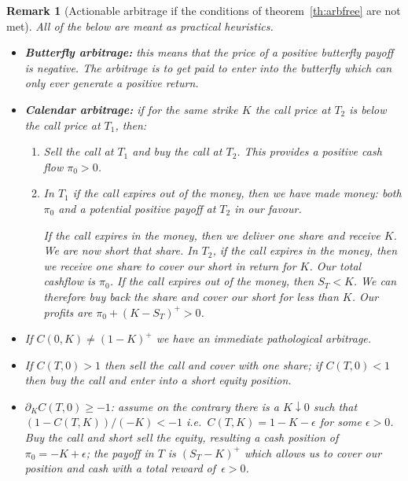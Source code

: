 \documentclass[11pt,a4paper]{article}
\newtheorem{remark}[definition]{Remark}
\begin{document}
\begin{remark}[Actionable arbitrage if the conditions of theorem~\ref{th:arbfree} are not met]\label{rem:actionable_arbitrage}
All of the below are meant as practical heuristics.
\begin{itemize}
    \item \textbf{Butterfly arbitrage:} this means that the price of a positive
    butterfly payoff is negative. The arbitrage is to get paid to enter into
    the butterfly which can only ever generate a positive return.

    \item \textbf{Calendar arbitrage:} if for the same strike $K$
    the call price at $T_2$ is below the call price
    at $T_1$, then:
    \begin{enumerate}
        \item
            Sell the call at $T_1$ and buy the call at $T_2$. This provides
            a positive cash flow $\pi_0>0$.
        \item
            In $T_1$ if the call expires out of the money, then we have made money: both
            $\pi_0$ and a potential positive payoff at $T_2$ in our favour.

            If the call expires in the money, then we deliver one share
            and receive $K$. We are now short that share.
            In $T_2$, if the call expires in the money, then we receive one share
            to cover our short in return for $K$. Our total cashflow is $\pi_0$.
            If the call expires out of the money, then $S_T<K$. We can therefore
            buy back the share and cover our short for less than $K$.
            Our profits are $\pi_0+(K-S_T)^+>0$.
    \end{enumerate}
    \item If $C(0,K) \not= (1-K)^+$ we have an immediate pathological arbitrage.
    \item If $C(T,0)>1$ then sell the call and cover with one share; if $C(T,0)<1$
    then buy the call and enter into a short equity position.

    \item $\partial_K C(T,0)\geq -1$: assume on the contrary there is a $K\downarrow 0$
    such that $(1-C(T,K))/(-K) < -1$ i.e.~$C(T,K) = 1-K - \epsilon$ for some $\epsilon>0$.
          Buy the call and short sell the equity, resulting a cash position of $\pi_0=-K+\epsilon$;
          the payoff in $T$ is $(S_T-K)^+$ which allows us to cover our position and cash
          with a total reward of~$\epsilon>0$.


\end{itemize}
\end{remark}
\end{document}
